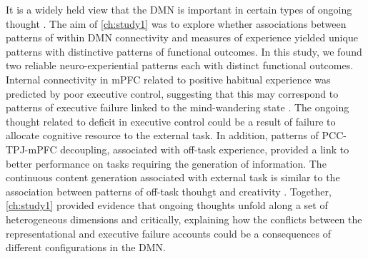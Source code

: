 It is a widely held view that the DMN is important in certain types of ongoing thought \cite<see review from>{SmallwoodSchooler2015}. The aim of \cref{ch:study1} was to explore whether associations between patterns of within DMN connectivity and measures of experience yielded unique patterns with distinctive patterns of functional outcomes. In this study, we found two reliable neuro-experiential patterns each with distinct functional outcomes. Internal connectivity in mPFC related to positive habitual experience was predicted by poor executive control, suggesting that this may correspond to patterns of executive failure linked to the mind-wandering state \cite{McVay2009}. The ongoing thought related to deficit in executive control could be a result of failure to allocate cognitive resource to the external task. In addition, patterns of PCC-TPJ-mPFC decoupling, associated with off-task experience, provided a link to better performance on tasks requiring the generation of information.  The continuous content generation associated with external task is similar to the association between patterns of off-task thouhgt and creativity \cite{Baird2012}. Together, \cref{ch:study1} provided evidence that ongoing thoughts unfold along a set of heterogeneous dimensions and critically, explaining how the conflicts between the representational and executive failure accounts could be a consequences of different configurations in the DMN.

